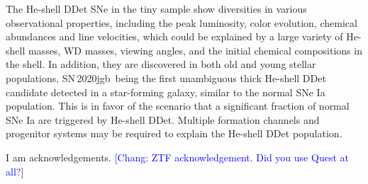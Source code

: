 \documentclass[twocolumn]{aastex631}
\newcommand{\sn}{SN\,2020jgb}
\newcommand{\chang}[1]{\textcolor{blue}{[Chang: #1]}}
\begin{document}
The He-shell DDet SNe in the tiny sample show diversities in various observational properties, including the peak luminosity, color evolution, chemical abundances and line velocities, which could be explained by a large variety of He-shell masses, WD masses, viewing angles, and the initial chemical compositions in the shell. In addition, they are discovered in both old and young stellar populations, \sn\ being the first unambiguous thick He-shell DDet candidate detected in a star-forming galaxy, similar to the normal SNe Ia population. This is in favor of the scenario that a significant fraction of normal SNe Ia are triggered by He-shell DDet. Multiple formation channels and progenitor systems may be required to explain the He-shell DDet population.

\begin{acknowledgements}
    I am acknowledgements. \chang{ZTF acknowledgement. Did you use Quest at all?}
\end{acknowledgements}







\end{document}
